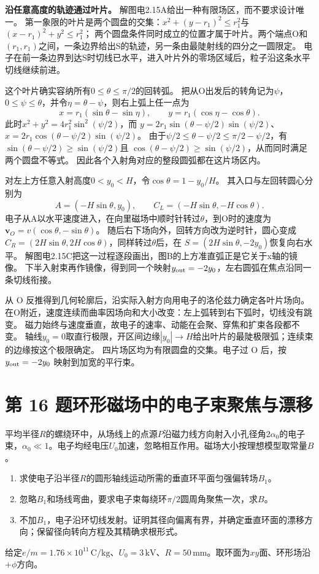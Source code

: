 \documentclass[UTF8,fontset=fandol,a4paper,11pt]{ctexart}
\begin{document}
\textbf{沿任意高度的轨迹通过叶片。} 解图电2.15A给出一种有限场区，而不要求设计唯一。
第一象限的叶片是两个圆盘的交集：$x^2+(y-r_1)^2\le r_1^2$与$(x-r_1)^2+y^2\le r_1^2$；
两个圆盘条件同时成立的位置才属于叶片。两个端点O和$(r_1,r_1)$之间，一条边界给出S的轨迹，另一条由最陡射线的四分之一圆限定。
电子在前一条边界到达S时切线已水平，进入叶片外的零场区域后，粒子沿这条水平切线继续前进。

这个叶片确实容纳所有$0\le\theta\le\pi/2$的回转弧。
把从O出发后的转角记为$\psi$，$0\le\psi\le\theta$，并令$\eta=\theta-\psi$，则右上弧上任一点为
\[
x=r_1(\sin\theta-\sin\eta),\qquad
y=r_1(\cos\eta-\cos\theta).
\]
此时$x^2+y^2=4r_1^2\sin^2(\psi/2)$，而
$y=2r_1\sin(\theta-\psi/2)\sin(\psi/2)$、
$x=2r_1\cos(\theta-\psi/2)\sin(\psi/2)$。
由于$\psi/2\le\theta-\psi/2\le\pi/2-\psi/2$，有
$\sin(\theta-\psi/2)\ge\sin(\psi/2)$且
$\cos(\theta-\psi/2)\ge\sin(\psi/2)$，从而同时满足两个圆盘不等式。
因此各个入射角对应的整段圆弧都在这片场区内。

对左上方任意入射高度$0<y_0<H$，令$\cos\theta=1-y_0/H$。
其入口与左回转圆心分别为
\[
A=(-H\sin\theta,y_0),\qquad C_L=(-H\sin\theta,-H\cos\theta).
\]
电子从A以水平速度进入，在向里磁场中顺时针转过$\theta$，到O时的速度为
$\boldsymbol v_O=v(\cos\theta,-\sin\theta)$。
随后右下场向外，回转方向改为逆时针，圆心变成
$C_R=(2H\sin\theta,2H\cos\theta)$，同样转过$\theta$后，在
$S=(2H\sin\theta,-2y_0)$恢复向右水平。
解图电2.15C把这一过程逐段画出，图B的上方准直弧正是它关于x轴的镜像。
下半入射束再作镜像，得到同一个映射$y_{\rm out}=-2y_0$，左右圆弧在焦点沿同一条切线衔接。

从 O 反推得到几何轮廓后，沿实际入射方向用电子的洛伦兹力确定各叶片场向。
在O附近，速度连续而曲率因场向和大小改变：左上弧转到右下弧时，切线没有跳变。
磁力始终与速度垂直，故电子的速率、动能在会聚、穿焦和扩束各段都不变。
轴线$y_0=0$取直行极限，开区间边缘$|y_0|\to H$给出叶片的最陡极限弧；连续束的边缘按这个极限确定。
四片场区均为有限圆盘的交集。电子过 O 后，按 $y_{\rm out}=-2y_0$ 映射到加宽的平行束。




\section*{第 16 题\quad 环形磁场中的电子束聚焦与漂移}\label{q:16}

平均半径$R$的螺绕环中，从场线上的点源$P$沿磁力线方向射入小孔径角$2\alpha_0$的电子束，$\alpha_0\ll1$。电子均经电压$U_0$加速，忽略相互作用。磁场大小按理想模型取常量$B$。
\begin{enumerate}
\item 求使电子沿半径$R$的圆形轴线运动所需的垂直环平面匀强偏转场$B_1$。
\item 忽略$B_1$和场线弯曲，要求电子束每绕环$\pi/2$圆周角聚焦一次，求$B$。
\item 不加$B_1$，电子沿环切线发射。证明其径向偏离有界，并确定垂直环面的漂移方向；保留径向转向方程及其精确求根形式。
\end{enumerate}
给定$e/m=1.76\times10^{11}\,\mathrm{C/kg}$、$U_0=3\,\mathrm{kV}$、$R=50\,\mathrm{mm}$。取环面为$xy$面、环形场沿$+\phi$方向。
\end{document}
